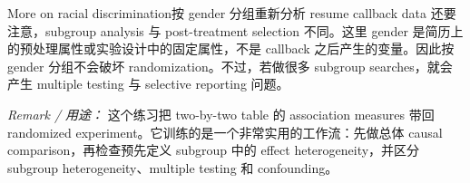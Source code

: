 \begin{exercisesolution}{More on racial discrimination}{按 gender 分组重新分析 resume callback data}
还要注意，subgroup analysis 与 post-treatment selection 不同。这里 gender 是简历上的预处理属性或实验设计中的固定属性，不是 callback 之后产生的变量。因此按 gender 分组不会破坏 randomization。不过，若做很多 subgroup searches，就会产生 multiple testing 与 selective reporting 问题。

\emph{Remark / 用途：} 这个练习把 two-by-two table 的 association measures 带回 randomized experiment。它训练的是一个非常实用的工作流：先做总体 causal comparison，再检查预先定义 subgroup 中的 effect heterogeneity，并区分 subgroup heterogeneity、multiple testing 和 confounding。
\end{exercisesolution}

